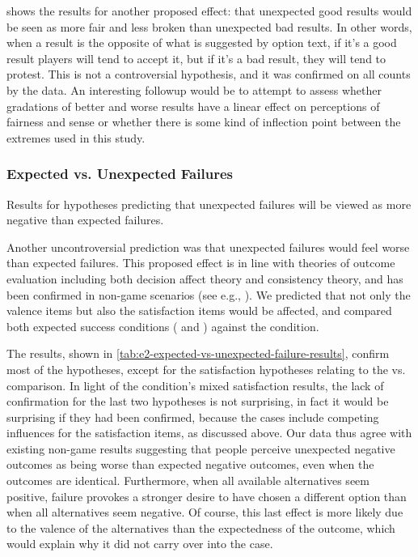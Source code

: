  shows the results for another proposed effect: that unexpected good results would be seen as more fair and less broken than unexpected bad results.
%
In other words, when a result is the opposite of what is suggested by option text, if it's a good result players will tend to accept it, but if it's a bad result, they will tend to protest.
%
This is not a controversial hypothesis, and it was confirmed on all counts by the data.
%
An interesting followup would be to attempt to assess whether gradations of better and worse results have a linear effect on perceptions of fairness and sense or whether there is some kind of inflection point between the extremes used in this study.


\subsubsection{Expected vs\@. Unexpected Failures}

\begin{table}[!b]
\centering
\bgroup
\def\arraystretch{1.3}
\setlength{\tabcolsep}{0.6em}

\egroup
\caption[Retrospective expected vs\@. unexpected failure results]{Results for hypotheses predicting that unexpected failures will be viewed as more negative than expected failures.}
  \label{tab:e2-expected-vs-unexpected-failure-results}
\end{table}

Another uncontroversial prediction was that unexpected failures would feel worse than expected failures.
%
This proposed effect is in line with theories of outcome evaluation including both decision affect theory and consistency theory, and has been confirmed in non-game scenarios (see e.g., \citep{Shepperd2002}).
%
We predicted that not only the valence items but also the satisfaction items would be affected, and compared both expected success conditions (\unxf{} and \obvfm{}) against the \expf{} condition.


The results, shown in \cref{tab:e2-expected-vs-unexpected-failure-results}, confirm most of the hypotheses, except for the satisfaction hypotheses relating to the \obvfm{} vs\@. \expf{} comparison.
%
In light of the \obvfm{} condition's mixed satisfaction results, the lack of confirmation for the last two hypotheses is not surprising, in fact it would be surprising if they had been confirmed, because the \obvf{} cases include competing influences for the satisfaction items, as discussed above.
%
Our data thus agree with existing non-game results suggesting that people perceive unexpected negative outcomes as being worse than expected negative outcomes, even when the outcomes are identical.
%
Furthermore, when all available alternatives seem positive, failure provokes a stronger desire to have chosen a different option than when all alternatives seem negative.
%
Of course, this last effect is more likely due to the valence of the alternatives than the expectedness of the outcome, which would explain why it did not carry over into the \obvfm{} case.

